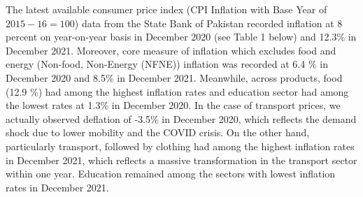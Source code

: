 \documentclass[12pt]{article}
\newcommand{\1}{\mathbbm 1}
\begin{document}
		
		
		The latest available consumer price index (CPI Inflation with Base Year of $2015-16 =100$) data from the State Bank of Pakistan recorded inflation at 8 percent on year-on-year basis in December 2020 (see Table 1 below) and 12.3\% in December 2021. Moreover, core measure of inflation which excludes food and energy (Non-food, Non-Energy (NFNE)) inflation was recorded at 6.4 $\%$ in December 2020 and 8.5$\%$ in December 2021. Meanwhile, across products, food (12.9 $\%$) had among the highest inflation rates and education sector had among the lowest rates at 1.3$\%$ in December 2020. In the case of transport prices, we actually observed deflation of -3.5$\%$ in December 2020, which reflects the demand shock due to lower mobility and the COVID crisis. On the other hand, particularly transport, followed by clothing had among the highest inflation rates in December 2021, which reflects a massive transformation in the transport sector within one year. Education remained among the sectors with lowest inflation rates in December 2021.
		
		
		
	
		
		
		
\end{document}
